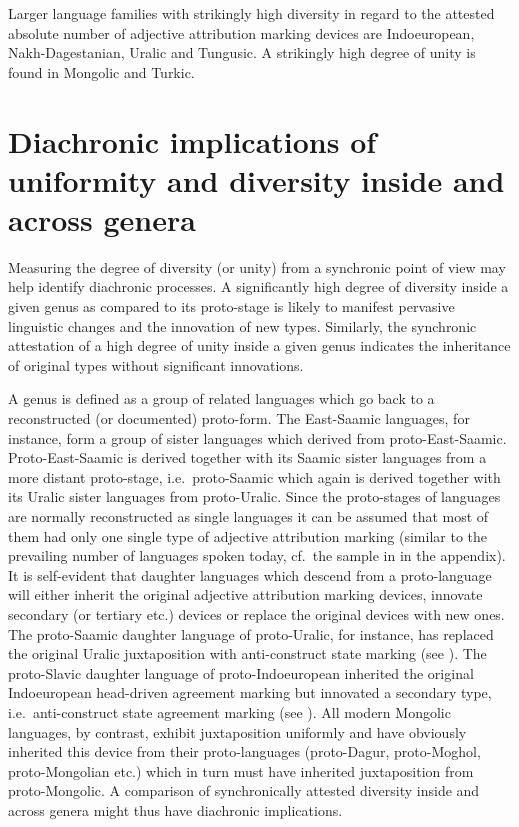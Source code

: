 Larger language families with strikingly high diversity in regard to the attested absolute number of adjective attribution marking devices are Indoeuropean, Nakh-Dagestanian, Uralic and Tungusic. A strikingly high degree of unity is found in Mongolic and Turkic.

\section[Diachronic implications]{Diachronic implications of uniformity and diversity inside and across genera}
Measuring the degree of diversity (or unity) from a synchronic point of view may help identify diachronic processes. A significantly high degree of diversity inside a given genus as compared to its proto-stage is likely to manifest pervasive linguistic changes and the innovation of new types. Similarly, the synchronic attestation of a high degree of unity inside a given genus indicates the inheritance of original types without significant innovations. 

A genus is defined as a group of related languages which go back to a reconstructed (or documented) proto-form. The East-Saamic languages, for instance, form a group of sister languages which derived from proto-East-Saamic. Proto-East-Saamic is derived together with its Saamic sister languages from a more distant proto-stage, i.e.~proto-Saamic which again is derived together with its Uralic sister languages from proto-Uralic. Since the proto-stages of languages are normally reconstructed as single languages it can be assumed that most of them had only one single type of adjective attribution marking (similar to the prevailing number of languages spoken today, cf.~the sample in  in the appendix). It is self-evident that daughter languages which descend from a proto-language will either inherit the original adjective attribution marking devices, innovate secondary (or tertiary etc.) devices or replace the original devices with new ones. The proto-Saamic daughter language of proto-Uralic, for instance, has replaced the original Uralic juxtaposition with anti-construct state marking (see ). The proto-Slavic daughter language of proto-Indoeuropean inherited the original Indoeuropean head-driven agreement marking but innovated a secondary type, i.e.~anti-construct state agreement marking (see ). All modern Mongolic languages, by contrast, exhibit juxtaposition uniformly and have obviously inherited this device from their proto-languages (proto-Dagur, proto-Moghol, proto-Mongolian etc.) which in turn must have inherited juxtaposition from proto-Mongolic. A comparison of synchronically attested diversity inside and across genera might thus have diachronic implications.

